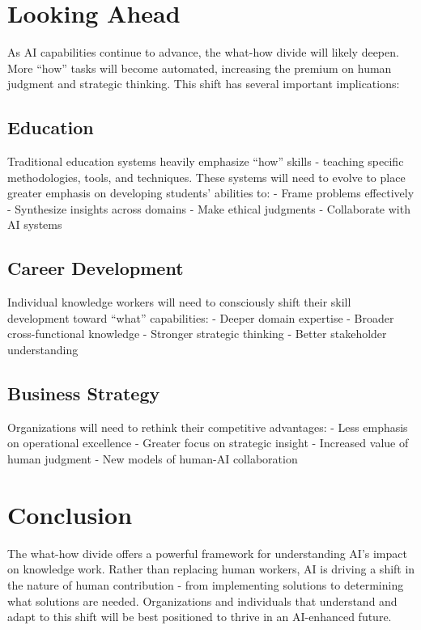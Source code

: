\documentclass[
  Letterpaper,
]{scrbook}
\begin{document}
\section{Looking Ahead}\label{looking-ahead}

As AI capabilities continue to advance, the what-how divide will likely
deepen. More ``how'' tasks will become automated, increasing the premium
on human judgment and strategic thinking. This shift has several
important implications:

\subsection{Education}\label{education}

Traditional education systems heavily emphasize ``how'' skills -
teaching specific methodologies, tools, and techniques. These systems
will need to evolve to place greater emphasis on developing students'
abilities to: - Frame problems effectively - Synthesize insights across
domains - Make ethical judgments - Collaborate with AI systems

\subsection{Career Development}\label{career-development}

Individual knowledge workers will need to consciously shift their skill
development toward ``what'' capabilities: - Deeper domain expertise -
Broader cross-functional knowledge - Stronger strategic thinking -
Better stakeholder understanding

\subsection{Business Strategy}\label{business-strategy}

Organizations will need to rethink their competitive advantages: - Less
emphasis on operational excellence - Greater focus on strategic insight
- Increased value of human judgment - New models of human-AI
collaboration

\section{Conclusion}\label{conclusion}

The what-how divide offers a powerful framework for understanding AI's
impact on knowledge work. Rather than replacing human workers, AI is
driving a shift in the nature of human contribution - from implementing
solutions to determining what solutions are needed. Organizations and
individuals that understand and adapt to this shift will be best
positioned to thrive in an AI-enhanced future.
\end{document}
